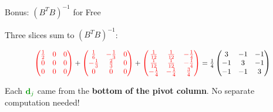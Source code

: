 \documentclass[10pt]{beamer}
\theoremstyle{definition}
\newcommand{\x}[1]{\alert{\textbf{#1}}}
\newcommand{\gn}[1]{{\color{green!60!black}#1}}       %
\newcommand{\rd}[1]{{\color{red}#1}}                  %
\begin{document}
\begin{frame}{Bonus: $(B^TB)^{-1}$ for Free}

Three slices sum to $(B^TB)^{-1}$:

$$\scalebox{0.88}{$\rd{\begin{pmatrix} \tfrac{1}{2} & 0 & 0 \\ 0 & 0 & 0 \\ 0 & 0 & 0 \end{pmatrix}} + \rd{\begin{pmatrix} \tfrac{1}{6} & {-}\tfrac{1}{3} & 0 \\ {-}\tfrac{1}{3} & \tfrac{2}{3} & 0 \\ 0 & 0 & 0 \end{pmatrix}} + \rd{\begin{pmatrix} \tfrac{1}{12} & \tfrac{1}{12} & {-}\tfrac{1}{4} \\ \tfrac{1}{12} & \tfrac{1}{12} & {-}\tfrac{1}{4} \\ {-}\tfrac{1}{4} & {-}\tfrac{1}{4} & \tfrac{3}{4} \end{pmatrix}} = \frac{1}{4}\begin{pmatrix} 3 & -1 & -1 \\ -1 & 3 & -1 \\ -1 & -1 & 3 \end{pmatrix}$}$$

\vspace{0.5em}

Each $\gn{\mathbf{d}_j}$ came from the \x{bottom of the pivot column}. No separate computation needed!

\end{frame}
\end{document}
